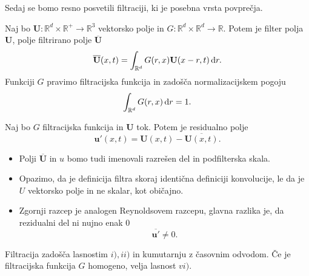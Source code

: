 \documentclass[mat2, tisk]{fmfdelo}
\newcommand{\R}{\mathbb R}
\newcommand{\bd}{\textbf}
\begin{document}
Sedaj se bomo resno posvetili filtraciji, ki je posebna vrsta povprečja.
\begin{definicija}
Naj bo $\bd{U}: \R^d\times \R^+ \rightarrow \R^3$ vektorsko polje in $G: \R^d\times \R^d \rightarrow \R$.
Potem je filter polja $\bd{U}$, polje filtrirano polje $\overline{\bd{U}}$
\begin{equation}
\overline{\bd{U}}(x, t) = \int_{\R^d} G(r, x)\bd{U}(x-r, t) \dif r.
\end{equation}
Funkciji $G$ pravimo filtracijska funkcija in zadošča normalizacijskem pogoju 
$$
\int_{\R^d} G(r, x) \dif r = 1.
$$
\end{definicija}

\begin{definicija}
Naj bo $G$ filtracijska funkcija in $\bd{U}$ tok. Potem je residualno polje 
\begin{equation}
\bd{u}'(x, t) = \bd{U}(x, t) - \overline{\bd{U}(x, t)}.
\end{equation}
\end{definicija}

\begin{opomba}
  \hfill
\begin{itemize}
\item Polji $\overline{\bd{U}}$ in $u$ bomo tudi imenovali razrešen del in podfilterska skala.
\item Opazimo, da je definicija filtra skoraj identična definiciji konvolucije, le da je  
$U$ vektorsko polje in ne skalar, kot običajno.
\item Zgornji razcep je analogen Reynoldsovem razcepu, glavna razlika je, da rezidualni 
del ni nujno enak $0$
$$ \overline{\bd{u}'} \neq 0.$$
\end{itemize}
\end{opomba}

\begin{trditev}
Filtracija zadošča lasnostim $i), ii)$ in kumutarnju z časovnim odvodom. Če je filtracijska funkcija $G$ homogeno, velja lasnost $vi)$.
\end{trditev}
\end{document}
